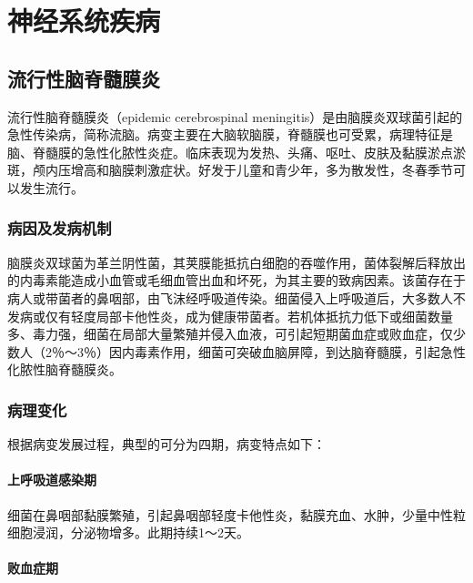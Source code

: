 \chapter{神经系统疾病}


\section{流行性脑脊髓膜炎}

流行性脑脊髓膜炎（epidemic cerebrospinal
meningitis）是由脑膜炎双球菌引起的急性传染病，简称流脑。病变主要在大脑软脑膜，脊髓膜也可受累，病理特征是脑、脊髓膜的急性化脓性炎症。临床表现为发热、头痛、呕吐、皮肤及黏膜淤点淤斑，颅内压增高和脑膜刺激症状。好发于儿童和青少年，多为散发性，冬春季节可以发生流行。

\subsection{病因及发病机制}

脑膜炎双球菌为革兰阴性菌，其荚膜能抵抗白细胞的吞噬作用，菌体裂解后释放出的内毒素能造成小血管或毛细血管出血和坏死，为其主要的致病因素。该菌存在于病人或带菌者的鼻咽部，由飞沫经呼吸道传染。细菌侵入上呼吸道后，大多数人不发病或仅有轻度局部卡他性炎，成为健康带菌者。若机体抵抗力低下或细菌数量多、毒力强，细菌在局部大量繁殖并侵入血液，可引起短期菌血症或败血症，仅少数人（2％～3％）因内毒素作用，细菌可突破血脑屏障，到达脑脊髓膜，引起急性化脓性脑脊髓膜炎。

\subsection{病理变化}

根据病变发展过程，典型的可分为四期，病变特点如下：

\subsubsection{上呼吸道感染期}

细菌在鼻咽部黏膜繁殖，引起鼻咽部轻度卡他性炎，黏膜充血、水肿，少量中性粒细胞浸润，分泌物增多。此期持续1～2天。

\subsubsection{败血症期}

